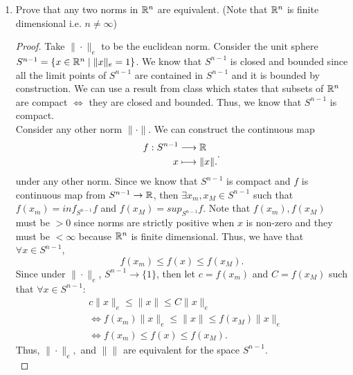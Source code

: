 \documentclass[a4paper]{article}
\begin{document}
\begin{enumerate}
\begin{proof}
        $\left( \leftarrow \right) $. Take an open set $U_2 \in (V, \rho_{2})$. This means that $\forall x \in U_2, \exists r_2 > 0$ such that:
        \[
        B_{r_2}(x) = \{y \in V \mid  \|x-y\|_{2} < r_2\} \subseteq U_2 
        .\] 
        Using equivalence of the norms, when we take $U_2$ in $\left( V, \rho_1 \right) $, we know that $\forall x \in U_2, \exists r_1 > 0$ such that:
        \begin{align*}
          B_{r_1}(x) = \{y \in V \mid \|x-y\|_{1} < r_1\} &\iff B_{r_1}(x) = \{y \in V \mid \|x-y\|_{1} \leq \frac{\|x-y\|_{2}}{c} < \frac{r_2}{c} \} \\ 
                                                          &\subseteq B_{r_2}(x) \\
                                                      &\subseteq U_2
        .\end{align*}
        So similarly, $U_2$ must also be an open set in $\left( V, \rho_1 \right) $ when the norms are equivalent.
      \end{proof} 
    \item Prove that any two norms in $\mathbb{R}^{n}$ are equivalent. (Note that $\mathbb{R}^{n}$ is finite dimensional i.e. $n \neq \infty$)
       \begin{proof}
         Take $\|\cdot \|_{e}$ to be the euclidean norm. Consider the unit sphere $S^{n-1} = \{x \in \mathbb{R}^{n} \mid \|x \|_{e} = 1 \} $. We know that $S^{n-1}$ is closed and bounded since all the limit points of $S^{n-1}$ are contained in $S^{n-1}$ and it is bounded by construction. We can use a result from class which states that subsets of $\mathbb{R}^{n}$ are compact $\iff$ they are closed and bounded. Thus, we know that $S^{n-1}$ is compact. \\

         Consider any other norm $\| \cdot \|$. We can construct the continuous map 
         \[
         \begin{align*}
           f: S^{n-1} &\longrightarrow \mathbb{R} \\
           x &\longmapsto \|x\| 
         .\end{align*}
         .\]
         under any other norm. Since we know that $S^{n-1}$ is compact and $f$ is continuous map from $S^{n-1} \to \mathbb{R}$, then $\exists x_m, x_M \in S^{n-1}$ such that $f(x_m) = inf_{S^{n-1}} f$ and $f(x_M) = sup_{S^{n-1}} f$. Note that $f(x_m), f(x_M)$ must be  $>0$ since norms are strictly positive when $x$ is non-zero and  they must be  $< \infty$ because  $\mathbb{R}^{n}$ is finite dimensional. Thus, we have that $\forall x \in S^{n-1}$, 
         \[
         f(x_m) \leq f(x) \leq f(x_M)
         .\] 
Since under  $\| \cdot \|_{e}$, $S^{n-1} \to \{1\} $, then let $c = f(x_m)$ and  $C= f(x_M)$ such that $\forall x \in S^{n-1}$:
\begin{align*}
& c \|x\|_{e} \leq \|x\| \leq C \|x\|_{e}  \\
& \iff f(x_m) \|x\|_{e} \leq \|x\| \leq f(x_M) \|x\|_{e} \\
 &\iff f(x_m) \leq f(x) \leq f(x_M)
.\end{align*}
Thus, $\| \cdot \|_{e},$ and $\|\|$ are equivalent for the space $S^{n-1}$. \\


\end{proof}
\end{enumerate}
\end{document}
